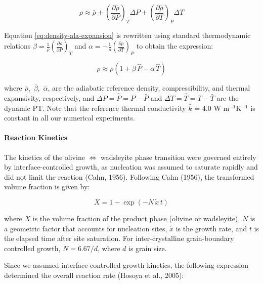 \documentclass[draft,linenumbers]{agujournal2019}
\begin{document}
\begin{equation}
  \rho \approx \bar{\rho} + \left(\frac{\partial \bar{\rho}}{\partial P} \right)_T \Delta P + \left(\frac{\partial \bar{\rho}}{\partial T} \right)_P \Delta T
  \label{eq:density-ala-expansion}
\end{equation}

Equation \ref{eq:density-ala-expansion} is rewritten using standard
thermodynamic relations
\(\beta = \frac{1}{\rho} \left(\frac{\partial \rho}{\partial P}\right)_T\)
and
\(\alpha = -\frac{1}{\rho} \left(\frac{\partial \rho}{\partial T}\right)_P\)
to obtain the expression:

\begin{equation}
  \rho \approx \bar{\rho} \left(1 + \bar{\beta}\, \hat{P} - \bar{\alpha}\, \hat{T} \right)
  \label{eq:density-ala}
\end{equation}

where \(\bar{\rho}\), \(\, \bar{\beta}\), \(\, \bar{\alpha}\), are the
adiabatic reference density, compressibility, and thermal expansivity,
respectively, and \(\Delta P = \hat{P} = P - \bar{P}\) and
\(\Delta T = \hat{T} = T - \bar{T}\) are the dynamic PT. Note that the
reference thermal conductivity \(\bar{k}\) = 4.0 W m\(^{-1}\)K\(^{-1}\)
is constant in all our numerical experiments.

\paragraph{Reaction Kinetics}\label{sec:reaction-kinetics}

The kinetics of the olivine \(\Leftrightarrow\) wadsleyite phase
transition were governed entirely by interface-controlled growth, as
nucleation was assumed to saturate rapidly and did not limit the
reaction (Cahn, 1956). Following Cahn (1956), the transformed volume
fraction is given by:

\begin{equation}
  X = 1 - \exp\!\left(-N\, \dot{x}\, t \right)
  \label{eq:volume-fraction}
\end{equation}

where \(X\) is the volume fraction of the product phase (olivine or
wadsleyite), \(N\) is a geometric factor that accounts for nucleation
sites, \(\dot{x}\) is the growth rate, and \(t\) is the elapsed time
after site saturation. For inter-crystalline grain-boundary controlled
growth, \(N = 6.67/d\), where \(d\) is grain size.

Since we assumed interface-controlled growth kinetics, the following
expression determined the overall reaction rate (Hosoya et al., 2005):
\end{document}
